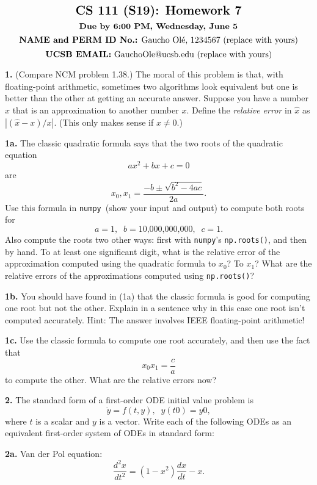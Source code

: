 \documentclass[11pt]{article}
\newcommand{\numpy}{{\tt numpy}}    %
\begin{document}
$$\mbox{\Large \textbf {CS 111 (S19): Homework 7}}$$
$$\mbox{\textbf {Due by 6:00 PM, Wednesday, June 5}}$$
$$\mbox{\textbf {NAME and PERM ID No.:} Gaucho Ol\'e, 1234567 (replace with yours)}$$
$$\mbox{\textbf {UCSB EMAIL:} GauchoOle@ucsb.edu (replace with yours)}$$

\par\bigskip
{\bf 1.} (Compare NCM problem 1.38.)
The moral of this problem is that, with floating-point arithmetic,
sometimes two algorithms look equivalent but one is better than the other
at getting an accurate answer.
Suppose you have a number $\hat x$ that is an approximation to another number $x$.
Define the {\em relative error} in $\hat x$ as 
$|(\hat x - x) / x |$.
(This only makes sense if $x\ne0$.)

\par\medskip
{\bf 1a.}
The classic quadratic formula says that the two roots of the quadratic equation
$$ ax^2 + bx + c = 0$$
are
$$ x_0, x_1 = \frac{-b\pm\sqrt{b^2-4ac}}{2a}. $$
Use this formula in \numpy\ (show your input and output) to compute both roots for
$$ a = 1, \;\; b = \mbox{10,000,000,000}, \;\; c = 1. $$
Also compute the roots two other ways: 
first with \numpy's {\tt np.roots()}, and then by hand.
To at least one significant digit, what is the relative error of the 
approximation computed using the quadratic formula to $x_0$? To $x_1$?
What are the relative errors of the approximations computed using {\tt np.roots()}?

\par\medskip
{\bf 1b.}
You should have found in (1a) that the classic formula is good for 
computing one root but not the other. 
Explain in a sentence why in this case one root isn't computed accurately.
Hint: The answer involves IEEE floating-point arithmetic!

\par\medskip
{\bf 1c.}
Use the classic formula to compute one root accurately, and then use the
fact that
$$ x_0x_1 = \frac{c}{a} $$
to compute the other.
What are the relative errors now?

\par\bigskip
{\bf 2.}
The standard form of a first-order ODE initial value problem is
$$ \dot y = f(t, y), \;\; y(t0) = y0, $$
where $t$ is a scalar and $y$ is a vector.
Write each of the following ODEs as an equivalent first-order system
of ODEs in standard form:

\par\bigskip
{\bf 2a.} Van der Pol equation:
$$ \frac{d^2 x}{dt^2} = (1-x^2)\frac{dx}{dt} - x . $$
\end{document}
